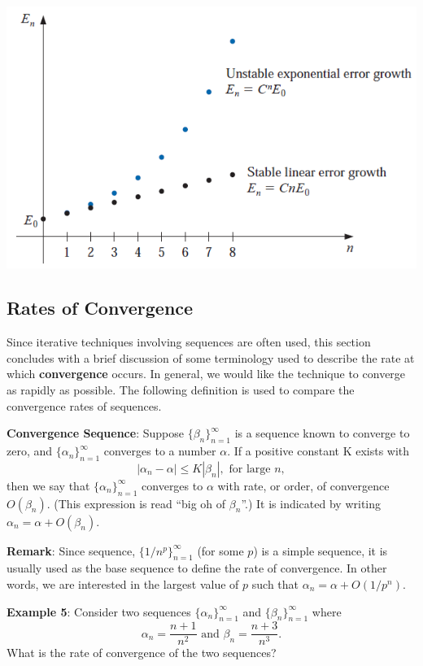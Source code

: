 \documentclass[
]{book}
\begin{document}
\hfill\break

\begin{center}\includegraphics[width=0.6\linewidth]{img02/w02-LinearExpErrorGrowth} \end{center}

\hypertarget{rates-of-convergence}{%
\subsection{Rates of Convergence}\label{rates-of-convergence}}

Since iterative techniques involving sequences are often used, this section concludes with a brief discussion of some terminology used to describe the rate at which \textbf{convergence} occurs. In general, we would like the technique to converge as rapidly as possible. The following definition is used to compare the convergence rates of sequences.

\textbf{Convergence Sequence}: Suppose \(\{\beta_n \}_{n=1}^\infty\) is a sequence known to converge to zero, and \(\{\alpha_n \}_{n=1}^\infty\) converges to a number \(\alpha\). If a positive constant K exists with
\[
|\alpha_n - \alpha| \le K|\beta_n|, \text{ for large } n,
\]
then we say that \(\{\alpha_n \}_{n=1}^\infty\) converges to \(\alpha\) with rate, or order, of convergence \(O(\beta_n)\). (This expression is read ``big oh of \(\beta_n\)''.) It is indicated by writing \(\alpha_n = \alpha + O(\beta_n)\).

\textbf{Remark}: Since sequence, \(\{1/n^p \}_{n=1}^\infty\) (for some \(p\)) is a simple sequence, it is usually used as the base sequence to define the rate of convergence. In other words, we are interested in the largest value of \(p\) such that \(\alpha_n = \alpha + O(1/p^n)\).

\hfill\break

\textbf{Example 5}: Consider two sequences \(\{\alpha_n \}_{n=1}^\infty\) and \(\{\beta_n \}_{n=1}^\infty\) where
\[
\alpha_n = \frac{n+1}{n^2} \text{ and  } \beta_n = \frac{n + 3}{n^3}.
\]
What is the rate of convergence of the two sequences?
\end{document}
